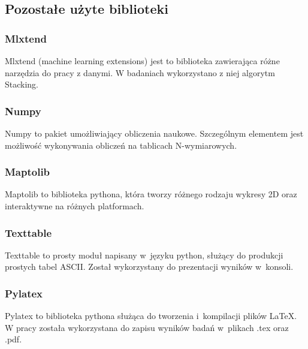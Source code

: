 \subsection{Pozostałe użyte biblioteki}
\subsubsection{Mlxtend}
Mlxtend (machine learning extensions)\cite{mlxtend} jest to biblioteka zawierająca różne narzędzia do pracy z danymi. W badaniach wykorzystano z niej algorytm Stacking.
\subsubsection{Numpy}
Numpy to pakiet umożliwiający obliczenia naukowe. Szczególnym elementem jest możliwość wykonywania obliczeń na tablicach N-wymiarowych. 
\subsubsection{Maptolib}
Maptolib to biblioteka pythona, która tworzy różnego rodzaju wykresy 2D oraz interaktywne na różnych platformach.
\subsubsection{Texttable}
Texttable to prosty moduł napisany w~języku python, służący do produkcji prostych tabel ASCII. Został wykorzystany do prezentacji wyników w~konsoli.
\subsubsection{Pylatex}
Pylatex to biblioteka pythona służąca do tworzenia i~kompilacji plików LaTeX. W pracy została wykorzystana do zapisu wyników badań w~plikach .tex oraz .pdf.

